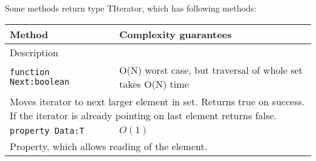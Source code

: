 Some methods return type TIterator, which has following methods:
\begin{longtable}{|m{10cm}|m{5cm}|}                                                             
\hline
Method & Complexity guarantees \\ \hline                                                  
\multicolumn{2}{|m{15cm}|}{Description} \\ \hline\hline                                               
\verb!function Next:boolean! & O(N) worst case, but traversal of whole set takes O(N) time \\\hline
\multicolumn{2}{|m{15cm}|}{Moves iterator to next larger element in set. Returns true on
success. If the iterator is already pointing on last element returns false.} \\\hline\hline

\verb!property Data:T! & $O(1)$ \\\hline
\multicolumn{2}{|m{15cm}|}{Property, which allows reading of the element.} \\\hline

\end{longtable}
